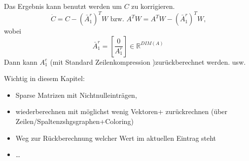 Das Ergebnis kann benutzt werden um $C$ zu korrigieren.
$$\dot{C} = C- (\bar{A}_1^r)^TW \text{ bzw. }A^TW = A^TW- (\bar{A}_1^r)^TW\text{,}$$
wobei
$$\bar{A}_1^r = \left[\frac{0}{A_1^r}\right] \in \mathbb{R}^{DIM(A)}$$
Dann kann $A_1^c$ (mit Standard Zeilenkompression )zurückberechnet werden. usw.

\noindent\makebox[\linewidth]{\rule{\paperwidth}{0.4pt}}

Wichtig in diesem Kapitel:
\begin{itemize}
	\item Sparse Matrizen mit Nichtnulleinträgen,
	\item wiederberechnen mit möglichst wenig Vektoren+ zurückrechnen (über Zeilen/Spaltenzshgsgraphen+Coloring)
	\item Weg zur Rückberechnung welcher Wert im aktuellen Eintrag steht
	\item \dots
\end{itemize}